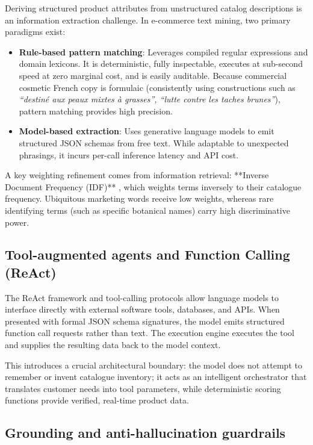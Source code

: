 Deriving structured product attributes from unstructured catalog descriptions is an information extraction challenge. In e-commerce text mining, two primary paradigms exist:
\begin{itemize}
  \item \textbf{Rule-based pattern matching}: Leverages compiled regular expressions and domain lexicons. It is deterministic, fully inspectable, executes at sub-second speed at zero marginal cost, and is easily auditable. Because commercial cosmetic French copy is formulaic (consistently using constructions such as \emph{``destiné aux peaux mixtes à grasses'', ``lutte contre les taches brunes''}), pattern matching provides high precision.
  \item \textbf{Model-based extraction}: Uses generative language models to emit structured JSON schemas from free text. While adaptable to unexpected phrasings, it incurs per-call inference latency and API cost.
\end{itemize}

A key weighting refinement comes from information retrieval: **Inverse Document Frequency (IDF)** \cite{sparckjones1972, robertson2004}, which weights terms inversely to their catalogue frequency. Ubiquitous marketing words receive low weights, whereas rare identifying terms (such as specific botanical names) carry high discriminative power.

\subsection{Tool-augmented agents and Function Calling (ReAct)}

The ReAct framework \cite{yao2023react} and tool-calling protocols \cite{schick2023toolformer} allow language models to interface directly with external software tools, databases, and APIs. When presented with formal JSON schema signatures, the model emits structured function call requests rather than text. The execution engine executes the tool and supplies the resulting data back to the model context.

This introduces a crucial architectural boundary: the model does not attempt to remember or invent catalogue inventory; it acts as an intelligent orchestrator that translates customer needs into tool parameters, while deterministic scoring functions provide verified, real-time product data.

\subsection{Grounding and anti-hallucination guardrails}

